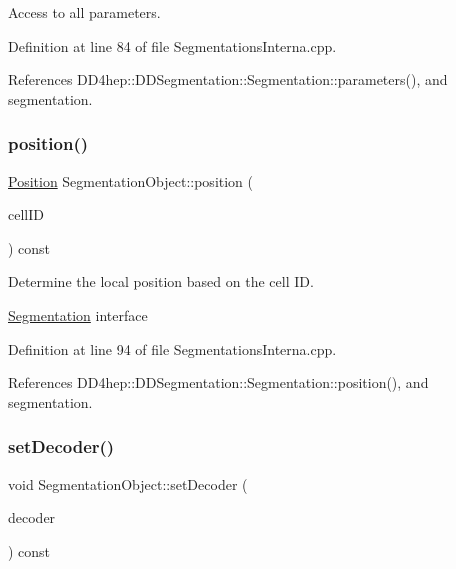 Access to all parameters. 



Definition at line 84 of file Segmentations\+Interna.\+cpp.



References D\+D4hep\+::\+D\+D\+Segmentation\+::\+Segmentation\+::parameters(), and segmentation.

\hypertarget{class_d_d4hep_1_1_geometry_1_1_segmentation_object_a8b541e7ca32f66c59bcda9fd7d9c461f}{}\label{class_d_d4hep_1_1_geometry_1_1_segmentation_object_a8b541e7ca32f66c59bcda9fd7d9c461f} 
\subsubsection{\texorpdfstring{position()}{position()}}
{\footnotesize\ttfamily \hyperlink{namespace_d_d4hep_1_1_geometry_a55083902099d03506c6db01b80404900}{Position} Segmentation\+Object\+::position (\begin{DoxyParamCaption}\item[{const Cell\+ID \&}]{cell\+ID }\end{DoxyParamCaption}) const}



Determine the local position based on the cell ID. 

\hyperlink{class_d_d4hep_1_1_geometry_1_1_segmentation}{Segmentation} interface 

Definition at line 94 of file Segmentations\+Interna.\+cpp.



References D\+D4hep\+::\+D\+D\+Segmentation\+::\+Segmentation\+::position(), and segmentation.

\hypertarget{class_d_d4hep_1_1_geometry_1_1_segmentation_object_a318c9d8bca82285c36af55528d401fd7}{}\label{class_d_d4hep_1_1_geometry_1_1_segmentation_object_a318c9d8bca82285c36af55528d401fd7} 
\subsubsection{\texorpdfstring{set\+Decoder()}{setDecoder()}}
{\footnotesize\ttfamily void Segmentation\+Object\+::set\+Decoder (\begin{DoxyParamCaption}\item[{\hyperlink{class_d_d4hep_1_1_d_d_segmentation_1_1_bit_field64}{Bit\+Field64} $\ast$}]{decoder }\end{DoxyParamCaption}) const}



